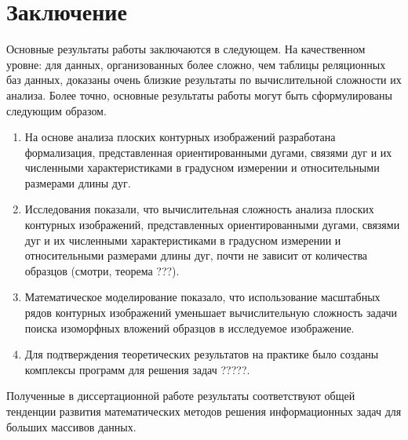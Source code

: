 \chapter*{Заключение}						%

Основные результаты работы заключаются в следующем. 
На качественном уровне: для данных, организованных более сложно, чем  таблицы реляционных баз данных, доказаны очень близкие результаты по вычислительной сложности их анализа.
Более точно, основные результаты работы могут быть сформулированы следующим образом.
\begin{enumerate}
\item На основе анализа плоских контурных изображений разработана формализация, представленная ориентированными дугами, связями дуг и их численными характеристиками в градусном измерении и  относительными размерами  длины дуг.
\item Исследования показали, что вычислительная сложность  анализа плоских контурных изображений, представленных ориентированными дугами, связями дуг и их численными характеристиками в градусном измерении и  относительными размерами  длины дуг, почти не зависит от количества образцов (смотри, теорема ???).
\item Математическое моделирование показало, что использование масштабных рядов контурных изображений уменьшает вычислительную сложность задачи поиска изоморфных вложений образцов в исследуемое изображение.
\item Для подтверждения теоретических результатов на практике  было созданы комплексы программ для решения задач ?????.
\end{enumerate}

Полученные в диссертационной работе результаты соответствуют общей
тенденции развития математических методов решения информационных задач для больших массивов данных.

\clearpage